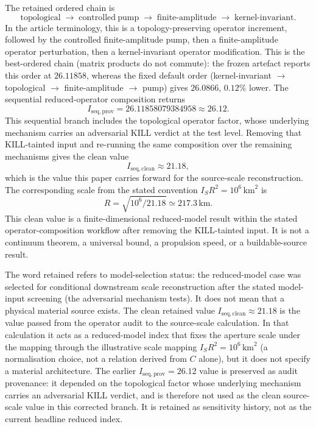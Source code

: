 \documentclass[11pt,a4paper]{article}
\begin{document}
The retained ordered chain is
\[
\mathrm{topological}
\;\longrightarrow\;
\mathrm{controlled\ pump}
\;\longrightarrow\;
\mathrm{finite\text{-}amplitude}
\;\longrightarrow\;
\mathrm{kernel\text{-}invariant}.
\]
In the article terminology, this is a topology-preserving operator increment, followed by the controlled finite-amplitude pump, then a finite-amplitude operator perturbation, then a kernel-invariant operator modification. This is the best-ordered chain (matrix products do not commute): the frozen artefact reports this order at $26.11858$, whereas the fixed default order (kernel-invariant $\to$ topological $\to$ finite-amplitude $\to$ pump) gives $26.0866$, $0.12\%$ lower. The sequential reduced-operator composition returns
\[
I_{\mathrm{seq,prov}} = 26.11858079384958 \approx 26.12.
\]
This sequential branch includes the topological operator factor, whose underlying mechanism carries an adversarial KILL verdict at the test level. Removing that KILL-tainted input and re-running the same composition over the remaining mechanisms gives the clean value
\[
I_{\mathrm{seq,clean}} \approx 21.18,
\]
which is the value this paper carries forward for the source-scale reconstruction. The corresponding scale from the stated convention $I_{S}R^{2}=10^{6}\,\mathrm{km}^{2}$ is
\[
R = \sqrt{10^{6}/21.18} \simeq 217.3\,\mathrm{km}.
\]
This clean value is a finite-dimensional reduced-model result within the stated operator-composition workflow after removing the KILL-tainted input. It is not a continuum theorem, a universal bound, a propulsion speed, or a buildable-source result.

The word retained refers to model-selection status: the reduced-model case was selected for conditional downstream scale reconstruction after the stated model-input screening (the adversarial mechanism tests). It does not mean that a physical material source exists. The clean retained value $I_{\mathrm{seq,clean}}\approx21.18$ is the value passed from the operator audit to the source-scale calculation. In that calculation it acts as a reduced-model index that fixes the aperture scale under the mapping through the illustrative scale mapping $I_{S}R^{2}=10^{6}\,\mathrm{km}^{2}$ (a normalisation choice, not a relation derived from $C$ alone), but it does not specify a material architecture. The earlier $I_{\mathrm{seq,prov}}=26.12$ value is preserved as audit provenance: it depended on the topological factor whose underlying mechanism carries an adversarial KILL verdict, and is therefore not used as the clean source-scale value in this corrected branch. It is retained as sensitivity history, not as the current headline reduced index.
\end{document}
